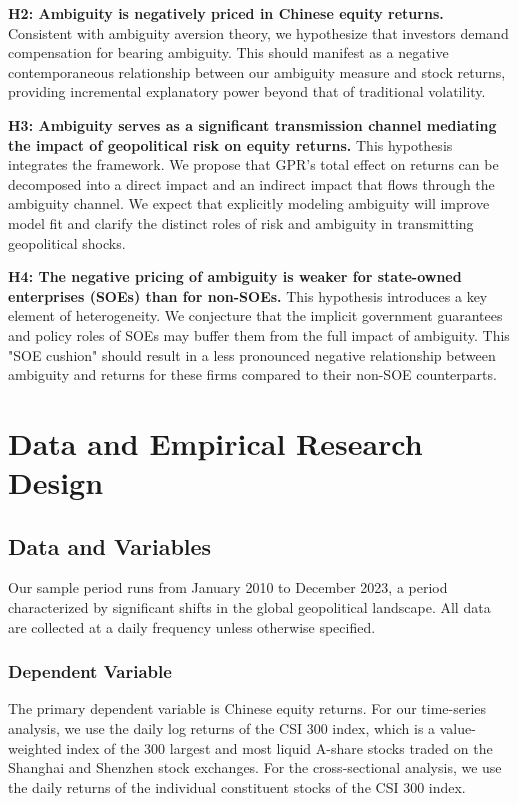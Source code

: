 \documentclass[preprint,12pt,authoryear]{elsarticle}
\begin{document}
\textbf{H2: Ambiguity is negatively priced in Chinese equity returns.}
Consistent with ambiguity aversion theory, we hypothesize that investors demand compensation for bearing ambiguity. This should manifest as a negative contemporaneous relationship between our ambiguity measure and stock returns, providing incremental explanatory power beyond that of traditional volatility.

\textbf{H3: Ambiguity serves as a significant transmission channel mediating the impact of geopolitical risk on equity returns.}
This hypothesis integrates the framework. We propose that GPR's total effect on returns can be decomposed into a direct impact and an indirect impact that flows through the ambiguity channel. We expect that explicitly modeling ambiguity will improve model fit and clarify the distinct roles of risk and ambiguity in transmitting geopolitical shocks.

\textbf{H4: The negative pricing of ambiguity is weaker for state-owned enterprises (SOEs) than for non-SOEs.}
This hypothesis introduces a key element of heterogeneity. We conjecture that the implicit government guarantees and policy roles of SOEs may buffer them from the full impact of ambiguity. This "SOE cushion" should result in a less pronounced negative relationship between ambiguity and returns for these firms compared to their non-SOE counterparts.


\section{Data and Empirical Research Design}
\label{sec:data}

\subsection{Data and Variables}

Our sample period runs from January 2010 to December 2023, a period characterized by significant shifts in the global geopolitical landscape. All data are collected at a daily frequency unless otherwise specified.

\subsubsection{Dependent Variable}
The primary dependent variable is Chinese equity returns. For our time-series analysis, we use the daily log returns of the CSI 300 index, which is a value-weighted index of the 300 largest and most liquid A-share stocks traded on the Shanghai and Shenzhen stock exchanges. For the cross-sectional analysis, we use the daily returns of the individual constituent stocks of the CSI 300 index.
\end{document}

